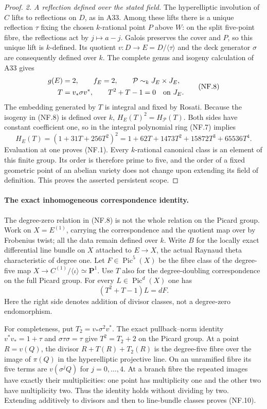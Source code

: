 \begin{proof}
\emph{2. A reflection defined over the stated field.}
The hyperelliptic involution of $C$ lifts to reflections on $D$,
as in A33. Among these lifts there is a unique reflection $\tau$
fixing the chosen $k$-rational point $P$ above $W$: on the split
five-point fibre, the reflections act by $j\mapsto a-j$.
Galois preserves the cover and $P$, so this unique lift is
$k$-defined. Its quotient $v:D\to E=D/\langle\tau\rangle$
and the deck generator $\sigma$ are consequently defined over $k$.
The complete genus and isogeny calculation of A33 gives
\[
 \begin{aligned}
 g(E)&=2,\qquad f_E=2,\qquad \mathcal P\sim_k J_E\times J_E,\\
 T&=v_*\sigma v^*,\qquad T^2+T-1=0\quad\hbox{on }J_E.
 \end{aligned}
 \tag{NF.8}
\]
The embedding generated by $T$ is integral and fixed by Rosati.
Because the isogeny in (NF.8) is defined over $k$,
$H_E(T)^2=H_{\mathcal P}(T)$. Both sides have constant
coefficient one, so in the integral polynomial ring (NF.7) implies
\[
 H_E(T)=(1+31T+256T^2)^2
      =1+62T+1473T^2+15872T^3+65536T^4.
 \tag{NF.9}
\]
Evaluation at one proves (NF.1). Every $k$-rational canonical
class is an element of this finite group. Its order is therefore
prime to five, and the order of a fixed geometric point of an
abelian variety does not change upon extending its field of
definition. This proves the asserted persistent scope.
\end{proof}

\paragraph{The exact inhomogeneous correspondence identity.}
The degree-zero relation in (NF.8) is not the whole relation on
the Picard group. Work on $X=E^{(1)}$, carrying the correspondence
and the quotient map over by Frobenius twist; all the data remain
defined over $k$. Write $B$ for the locally exact differential line
bundle on $X$ attached to $E\to X$, the actual Raynaud theta
characteristic of degree one. Let $F\in\operatorname{Pic}^5(X)$
be the fibre class of the degree-five map
$X\to C^{(1)}/\langle\iota\rangle\simeq\mathbf P^1$.
Use $T$ also for the degree-doubling correspondence on the full
Picard group. For every $L\in\operatorname{Pic}^d(X)$ one has
\[
                       (T^2+T-1)L=dF.
 \tag{NF.10}
\]
Here the right side denotes addition of divisor classes, not a
degree-zero endomorphism.

For completeness, put $T_2=v_*\sigma^2v^*$. The exact
pullback--norm identity $v^*v_*=1+\tau$ and
$\sigma\tau\sigma=\tau$ give
$T^2=T_2+2$ on the Picard group. At a point $R=v(Q)$,
the divisor $R+T(R)+T_2(R)$ is the degree-five fibre over the
image of $\pi(Q)$ in the hyperelliptic projective line. On an
unramified fibre its five terms are $v(\sigma^jQ)$ for
$j=0,\ldots,4$. At a branch fibre the repeated images have
exactly their multiplicities: one point has multiplicity one and
the other two have multiplicity two. Thus the identity holds
without dividing by two. Extending additively to divisors and
then to line-bundle classes proves (NF.10).


